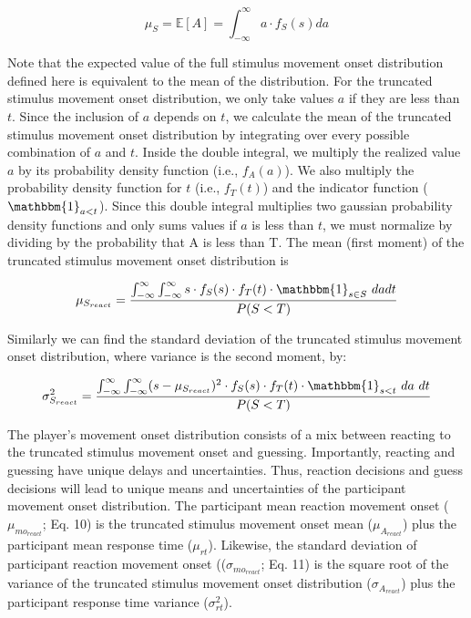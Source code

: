 \documentclass[12pt,letterpaper]{article}
\begin{document}
\begin{equation}
    \mu_{S} = \mathbb{E}[A] = \int_{-\infty}^{\infty}a \cdot f_{S}(s)da
\end{equation}

Note that the expected value of the full stimulus movement onset distribution defined here is equivalent to the mean of the distribution. For the truncated stimulus movement onset distribution, we only take values $a$ if they are less than $t$. Since the inclusion of $a$ depends on $t$, we calculate the mean of the truncated stimulus movement onset distribution by integrating over every possible combination of $a$ and $t$. Inside the double integral, we multiply the realized value $a$ by its probability density function (i.e., $f_{A}(a)$). We also multiply the probability density function for $t$ (i.e., $f_{T}(t)$) and the indicator function ($\mathbbm{1}_{a<t}$). Since this double integral multiplies two gaussian probability density functions and only sums values if $a$ is less than $t$, we must normalize by dividing by the probability that A is less than T. The mean (first moment) of the truncated stimulus movement onset distribution is


\begin{equation}
    \mu_{S_{react}} = \dfrac{\int_{-\infty}^{\infty}  \int_{-\infty}^{\infty} s \cdot f_{S}(s) \cdot f_{T}(t) \cdot \mathbbm{1}_{s \in S} \ dadt} {P(S<T)}
\end{equation}

Similarly we can find the standard deviation of the truncated stimulus movement onset distribution, where variance is the second moment, by:

\begin{equation}
    \sigma^2_{S_{react}} = \dfrac{\int_{-\infty}^{\infty}  \int_{-\infty}^{\infty} (s - \mu_{S_{react}})^2 \cdot f_{S}(s) \cdot f_{T}(t) \cdot \mathbbm{1}_{s<t} \ da \ dt}{P(S<T)}
\end{equation}

The player’s movement onset distribution consists of a mix between reacting to the truncated stimulus movement onset and guessing. Importantly, reacting and guessing have unique delays and uncertainties. Thus, reaction decisions and guess decisions will lead to unique means and uncertainties of the participant movement onset distribution.
The participant mean reaction movement onset ($\mu_{mo_{react}}$; Eq. 10) is the truncated stimulus movement onset mean ($\mu_{A_{react}}$) plus the participant mean response time ($\mu_{rt}$). Likewise, the standard deviation of participant reaction movement onset (($\sigma_{mo_{react}}$; Eq. 11) is the square root of the variance of the truncated stimulus movement onset distribution ($\sigma_{A_{react}}$) plus the participant response time variance ($\sigma_{rt}^2$).
\end{document}
